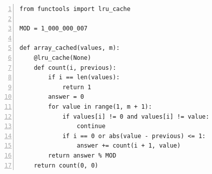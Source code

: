 \documentclass[aspectratio=169]{beamer}
\begin{document}
\begin{frame}
\begin{lrbox}{\codebox}\begin{minipage}{558pt}
\begin{lstlisting}[basicstyle=\ttfamily\fontsize{16.5}{18.5}\selectfont\color{ink},numbers=left,numberstyle=\ttfamily\fontsize{10.7}{18.5}\selectfont\color{quiet},numbersep=12pt,xleftmargin=27pt,firstnumber=1,breaklines=false,aboveskip=0pt,belowskip=0pt]
from functools import lru_cache

MOD = 1_000_000_007

def array_cached(values, m):
    @lru_cache(None)
    def count(i, previous):
        if i == len(values):
            return 1
        answer = 0
        for value in range(1, m + 1):
            if values[i] != 0 and values[i] != value:
                continue
            if i == 0 or abs(value - previous) <= 1:
                answer += count(i + 1, value)
        return answer % MOD
    return count(0, 0)
\end{lstlisting}
\end{minipage}\end{lrbox}

\end{frame}
\end{document}
